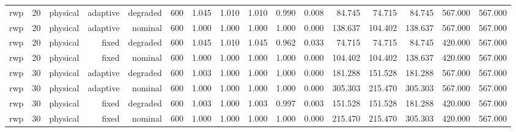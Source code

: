 \begin{tabular}{lrrrrrrrrrrrrrrr}
rwp & 20 & physical & adaptive & degraded & 600 & 1.045 & 1.010 & 1.010 & 0.990 & 0.008 & 84.745 & 74.715 & 84.745 & 567.000 & 567.000 \\
rwp & 20 & physical & adaptive & nominal & 600 & 1.000 & 1.000 & 1.000 & 1.000 & 0.000 & 138.637 & 104.402 & 138.637 & 567.000 & 567.000 \\
rwp & 20 & physical & fixed & degraded & 600 & 1.045 & 1.010 & 1.045 & 0.962 & 0.033 & 74.715 & 74.715 & 84.745 & 420.000 & 567.000 \\
rwp & 20 & physical & fixed & nominal & 600 & 1.000 & 1.000 & 1.000 & 1.000 & 0.000 & 104.402 & 104.402 & 138.637 & 420.000 & 567.000 \\
rwp & 30 & physical & adaptive & degraded & 600 & 1.003 & 1.000 & 1.000 & 1.000 & 0.000 & 181.288 & 151.528 & 181.288 & 567.000 & 567.000 \\
rwp & 30 & physical & adaptive & nominal & 600 & 1.000 & 1.000 & 1.000 & 1.000 & 0.000 & 305.303 & 215.470 & 305.303 & 567.000 & 567.000 \\
rwp & 30 & physical & fixed & degraded & 600 & 1.003 & 1.000 & 1.003 & 0.997 & 0.003 & 151.528 & 151.528 & 181.288 & 420.000 & 567.000 \\
rwp & 30 & physical & fixed & nominal & 600 & 1.000 & 1.000 & 1.000 & 1.000 & 0.000 & 215.470 & 215.470 & 305.303 & 420.000 & 567.000 \\
\bottomrule
\end{tabular}